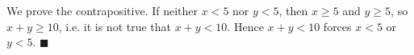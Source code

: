 We prove the contrapositive. If neither $x<5$ nor $y<5$, then $x\ge5$ and $y\ge5$, so $x+y\ge10$, i.e. it is not true that $x+y<10$. Hence $x+y<10$ forces $x<5$ or $y<5$. $\blacksquare$

